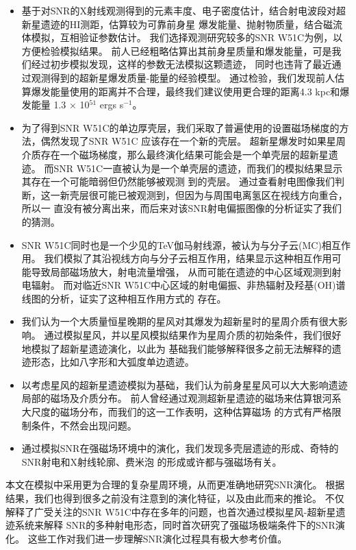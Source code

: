 \begin{itemize}
  \item 基于对SNR的X射线观测得到的元素丰度、电子密度估计，结合射电波段对超新星遗迹的HI测距，估算较为可靠前身星
  爆发能量、抛射物质量，结合磁流体模拟，互相验证参数估计。
  我们选择观测研究较多的SNR W51C为例，以方便检验模拟结果。
  前人已经粗略估算出其前身星质量和爆发能量，可是我们经过初步模拟发现，这样的参数无法模拟这颗遗迹，
  同时也违背了最近通过观测得到的超新星爆发质量-能量的经验模型。
  通过检验，我们发现前人估算爆发能量使用的距离并不合理，最终我们建议使用更合理的距离4.3 kpc和爆发能量
  1.3 $\times$ 10$^{51}$ ergs s$^{-1}$。

  \item 为了得到SNR W51C的单边厚壳层，我们采取了普遍使用的设置磁场梯度的方法，偶然发现了SNR W51C
  应该存在一个新的壳层。
  超新星爆发时如果星周介质存在一个磁场梯度，那么最终演化结果可能会是一个单壳层的超新星遗迹。
  而SNR W51C一直被认为是一个单壳层的遗迹，而我们的模拟结果显示其存在一个可能暗弱但仍然能够被观测
  到的壳层。
  通过查看射电图像我们判断，这一新壳层很可能已被观测到，但因为与周围电离氢区在视线方向重合，所以一
  直没有被分离出来，而后来对该SNR射电偏振图像的分析证实了我们的猜测。

  \item SNR W51C同时也是一个少见的TeV伽马射线源，被认为与分子云(MC)相互作用。
  我们模拟了其沿视线方向与分子云相互作用，结果显示这种相互作用可能导致局部磁场放大，射电流量增强，
  从而可能在遗迹的中心区域观测到射电辐射。
  而对临近SNR W51C中心区域的射电偏振、非热辐射及羟基(OH)谱线图的分析，证实了这种相互作用方式的
  存在。

  \item 我们认为一个大质量恒星晚期的星风对其爆发为超新星时的星周介质有很大影响。
  通过模拟星风，并以星风模拟结果作为星周介质的初始条件，我们很好地模拟了超新星遗迹演化，以此为
  基础我们能够解释很多之前无法解释的遗迹形态，比如八字形和大弧度单边遗迹。

  \item 以考虑星风的超新星遗迹模拟为基础，我们认为前身星星风可以大大影响遗迹局部的磁场及介质分布。
  前人曾经通过观测超新星遗迹的磁场来估算银河系大尺度的磁场分布，而我们的这一工作表明，这种估算磁场
  的方式有严格限制条件，不然会出现问题。

  \item 通过模拟SNR在强磁场环境中的演化，我们发现多壳层遗迹的形成、奇特的SNR射电和X射线轮廓、费米泡
  的形成或许都与强磁场有关。
\end{itemize}

本文在模拟中采用更为合理的复杂星周环境，从而更准确地研究SNR演化。
根据结果，我们也得到很多之前没有注意到的演化特征，以及由此而来的推论。
不仅解释了广受关注的SNR W51C中存在多年的问题，也首次通过模拟星风-超新星遗迹系统来解释
SNR的多种射电形态，同时首次研究了强磁场极端条件下的SNR演化。
这些工作对我们进一步理解SNR演化过程具有极大参考价值。

